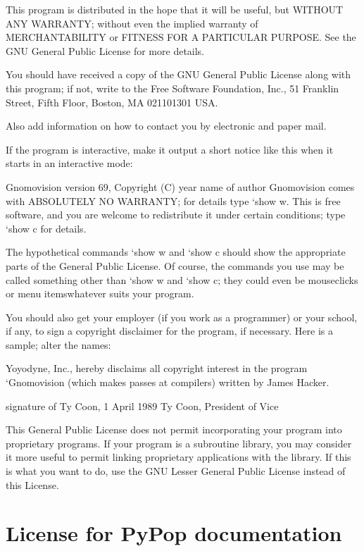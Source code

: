 \documentclass[letterpaper,10pt,english,openany,oneside]{sphinxmanual}
\begin{document}
\begin{sphinxVerbatim}[commandchars=\\\{\}]
    This program is distributed in the hope that it will be useful,
    but WITHOUT ANY WARRANTY; without even the implied warranty of
    MERCHANTABILITY or FITNESS FOR A PARTICULAR PURPOSE.  See the
    GNU General Public License for more details.

    You should have received a copy of the GNU General Public License along
    with this program; if not, write to the Free Software Foundation, Inc.,
    51 Franklin Street, Fifth Floor, Boston, MA 02110\PYGZhy{}1301 USA.

Also add information on how to contact you by electronic and paper mail.

If the program is interactive, make it output a short notice like this
when it starts in an interactive mode:

    Gnomovision version 69, Copyright (C) year name of author
    Gnomovision comes with ABSOLUTELY NO WARRANTY; for details type `show w\PYGZsq{}.
    This is free software, and you are welcome to redistribute it
    under certain conditions; type `show c\PYGZsq{} for details.

The hypothetical commands `show w\PYGZsq{} and `show c\PYGZsq{} should show the appropriate
parts of the General Public License.  Of course, the commands you use may
be called something other than `show w\PYGZsq{} and `show c\PYGZsq{}; they could even be
mouse\PYGZhy{}clicks or menu items\PYGZhy{}\PYGZhy{}whatever suits your program.

You should also get your employer (if you work as a programmer) or your
school, if any, to sign a \PYGZdq{}copyright disclaimer\PYGZdq{} for the program, if
necessary.  Here is a sample; alter the names:

  Yoyodyne, Inc., hereby disclaims all copyright interest in the program
  `Gnomovision\PYGZsq{} (which makes passes at compilers) written by James Hacker.

  \PYGZlt{}signature of Ty Coon\PYGZgt{}, 1 April 1989
  Ty Coon, President of Vice

This General Public License does not permit incorporating your program into
proprietary programs.  If your program is a subroutine library, you may
consider it more useful to permit linking proprietary applications with the
library.  If this is what you want to do, use the GNU Lesser General
Public License instead of this License.
\end{sphinxVerbatim}


\section{License for PyPop documentation}
\label{\detokenize{docs/licenses:license-for-pypop-documentation}}
\end{document}
